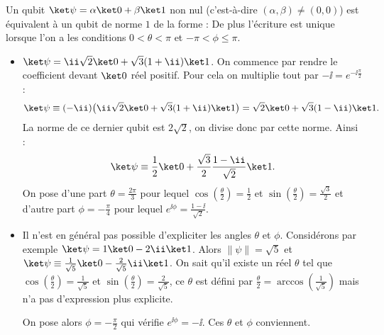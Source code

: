 \documentclass[11pt,class=report,crop=false]{standalone}
\begin{document}
\begin{proposition}
\label{prop:dimdeux}
Un qubit $\ket\psi = \alpha\ket0+\beta\ket1$ non nul (c'est-à-dire $(\alpha,\beta)\neq(0,0)$) est équivalent à un qubit de norme $1$ de la forme :
De plus l'écriture est unique lorsque l'on a les conditions $0<\theta<\pi$ et $-\pi < \phi \le \pi$.
\end{proposition}


\begin{exemple}
\sauteligne
\begin{itemize}
  \item $\ket\psi = \ii\sqrt2\ket0 + \sqrt3(1+\ii)\ket1$.
  On commence par rendre le coefficient devant $\ket0$ réel positif. Pour cela on multiplie tout par $-\ii = e^{-\ii\frac\pi2}$ :
  $$\ket\psi \equiv (-\ii)\big(\ii\sqrt2\ket0 + \sqrt3(1+\ii)\ket1\big)
  = \sqrt2\ket0 + \sqrt3(1-\ii)\ket1.$$
  La norme de ce dernier qubit est $2\sqrt2$, on divise donc par cette norme. Ainsi :
  $$\ket\psi \equiv \frac12\ket0 + \frac{\sqrt3}{2} \frac{1-\ii}{\sqrt2}\ket1.$$
  On pose d'une part $\theta=\frac{2\pi}3$ pour lequel $\cos\left(\frac\theta2\right)=\frac12$ et $\sin\left(\frac\theta2\right)= \frac{\sqrt3}{2}$ et d'autre part $\phi=-\frac{\pi}{4}$ pour lequel
  $e^{\ii\phi} = \frac{1-\ii}{\sqrt2}$.
  
 
  \item Il n'est en général pas possible d'expliciter les angles $\theta$ et $\phi$.
  Considérons par exemple $\ket\psi = 1\ket0 - 2\ii\ket1$.
  Alors $\|\psi\| = \sqrt5$ et
  $\ket\psi \equiv \frac{1}{\sqrt5}\ket0 -\frac{2}{\sqrt5}\ii\ket1$.
  On sait qu'il existe un réel $\theta$ tel que $\cos\left(\frac\theta2\right) = \frac{1}{\sqrt5}$
  et $\sin\left(\frac\theta2\right) = \frac{2}{\sqrt5}$, ce $\theta$ est défini par 
  $\frac\theta2 = \operatorname{arccos}(\frac{1}{\sqrt5})$ mais n'a pas d'expression plus explicite.
  
  On pose alors $\phi = -\frac\pi2$ qui vérifie $e^{\ii\phi} = -\ii$.
  Ces $\theta$ et $\phi$ conviennent.
  
\end{itemize} 
\end{exemple}
\end{document}
